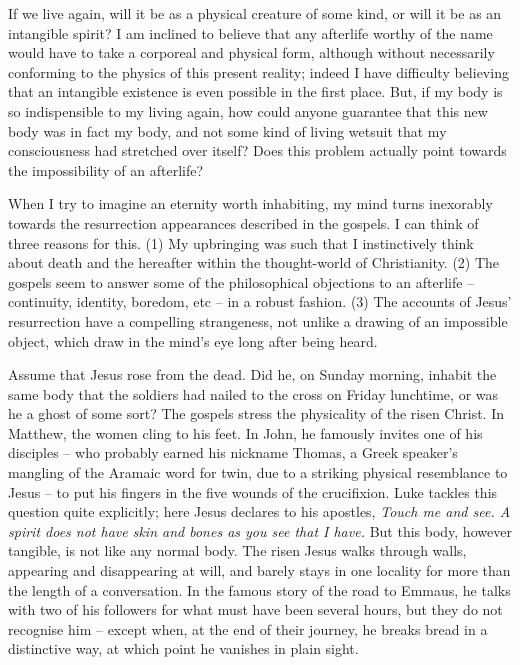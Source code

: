 \prosesep

If we live again, will it be as a physical creature of some kind, or will it be as an intangible spirit? I am inclined to believe that any afterlife worthy of the name would have to take a corporeal and physical form, although without necessarily conforming to the physics of this present reality; indeed I have difficulty believing that an intangible existence is even possible in the first place. But, if my body is so indispensible to my living again, how could anyone guarantee that this new body was in fact my body, and not some kind of living wetsuit that my consciousness had stretched over itself? Does this problem actually point towards the impossibility of an afterlife?

\prosesep

When I try to imagine an eternity worth inhabiting, my mind turns inexorably towards the resurrection appearances described in the gospels. I can think of three reasons for this. (1) My upbringing was such that I instinctively think about death and the hereafter within the thought-world of Christianity. (2) The gospels seem to answer some of the philosophical objections to an afterlife -- continuity, identity, boredom, etc -- in a robust fashion. (3) The accounts of Jesus' resurrection have a compelling strangeness, not unlike a drawing of an impossible object, which draw in the mind's eye long after being heard.

Assume that Jesus rose from the dead. Did he, on Sunday morning, inhabit the same body that the soldiers had nailed to the cross on Friday lunchtime, or was he a ghost of some sort? The gospels stress the physicality of the risen Christ. In Matthew, the women cling to his feet. In John, he famously invites one of his disciples -- who probably earned his nickname Thomas, a Greek speaker's mangling of the Aramaic word for twin, due to a striking physical resemblance to Jesus -- to put his fingers in the five wounds of the crucifixion. Luke tackles this question quite explicitly; here Jesus declares to his apostles, \textit{Touch me and see. A spirit does not have skin and bones as you see that I have.} But this body, however tangible, is not like any normal body. The risen Jesus walks through walls, appearing and disappearing at will, and barely stays in one locality for more than the length of a conversation. In the famous story of the road to Emmaus, he talks with two of his followers for what must have been several hours, but they do not recognise him -- except when, at the end of their journey, he breaks bread in a distinctive way, at which point he vanishes in plain sight.

